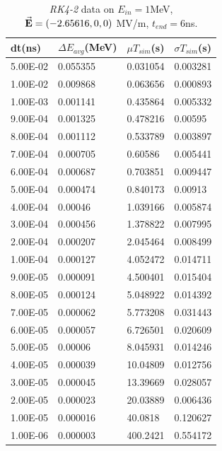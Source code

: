 \documentclass[a4paper,oneside,12pt]{report}
\numberwithin{equation}{chapter}
\begin{document}
\begin{table}[H]
    \centering
    \caption{\textit{RK4-2} data on $E_{in}=1$MeV, $\vec{\textbf{E}}=(-2.65616, 0, 0)$ MV/m, $t_{end}=6$ns.}
    \vspace{10pt}
    \begin{tabular}{|l|l|l|l|}
    \hline
    dt(ns)       & $\Delta E_{avg}$(MeV) & $\mu T_{sim}$(s)    & $\sigma T_{sim}$(s) \\\hline
        5.00E-02 & 0.055355     & 0.031054 & 0.003281 \\\hline
        1.00E-02 & 0.009868     & 0.063656 & 0.000893 \\\hline
        1.00E-03 & 0.001141     & 0.435864 & 0.005332 \\\hline
        9.00E-04 & 0.001325     & 0.478216 & 0.00595  \\\hline
        8.00E-04 & 0.001112     & 0.533789 & 0.003897 \\\hline
        7.00E-04 & 0.000705     & 0.60586  & 0.005441 \\\hline
        6.00E-04 & 0.000687     & 0.703851 & 0.009447 \\\hline
        5.00E-04 & 0.000474     & 0.840173 & 0.00913  \\\hline
        4.00E-04 & 0.00046      & 1.039166 & 0.005874 \\\hline
        3.00E-04 & 0.000456     & 1.378822 & 0.007995 \\\hline
        2.00E-04 & 0.000207     & 2.045464 & 0.008499 \\\hline
        1.00E-04 & 0.000127     & 4.052472 & 0.014711 \\\hline
        9.00E-05 & 0.000091     & 4.500401 & 0.015404 \\\hline
        8.00E-05 & 0.000124     & 5.048922 & 0.014392 \\\hline
        7.00E-05 & 0.000062     & 5.773208 & 0.031443 \\\hline
        6.00E-05 & 0.000057     & 6.726501 & 0.020609 \\\hline
        5.00E-05 & 0.00006      & 8.045931 & 0.014246 \\\hline
        4.00E-05 & 0.000039     & 10.04809 & 0.012756 \\\hline
        3.00E-05 & 0.000045     & 13.39669 & 0.028057 \\\hline
        2.00E-05 & 0.000023     & 20.03889 & 0.006436 \\\hline
        1.00E-05 & 0.000016     & 40.0818  & 0.120627 \\\hline
        1.00E-06 & 0.000003     & 400.2421 & 0.554172 \\\hline 
    \end{tabular}
    \label{tab:rk2_statE_table}
\end{table}
\end{document}
